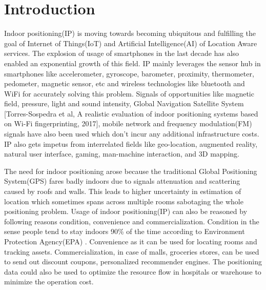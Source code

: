 \section{Introduction} \label{intro}
Indoor positioning(IP) is moving towards becoming ubiquitous and fulfilling the goal of Internet of Things(IoT) and Artificial Intelligence(AI) of Location Aware services.  The explosion of usage of smartphones in the last decade has also enabled an exponential growth of this field. IP mainly leverages the sensor hub in smartphones like accelerometer, gyroscope, barometer, proximity, thermometer, pedometer, magnetic sensor, etc and wireless technologies like bluetooth and WiFi for accurately solving this problem. Signals of opportunities like magnetic field, pressure, light and sound intensity, Global Navigation Satellite System [Torres-Sospedra et al, A realistic evaluation of indoor positioning systems based on Wi-Fi fingerprinting, 2017], mobile network \cite{99} and frequency modulation(FM)\cite{98} signals have also been used which don't incur any additional infrastructure costs.  IP also gets impetus from interrelated fields like geo-location, augmented reality, natural user interface, gaming, man-machine interaction, and 3D mapping.

\vspace{3mm}
The need for indoor positioning arose because the traditional Global Positioning System(GPS) fares badly indoors due to signals attenuation and scattering caused by roofs and walls. This leads to higher uncertainty in estimation of location which sometimes spans across multiple rooms sabotaging the whole positioning problem.  Usage of indoor positioning(IP) can also be reasoned by following reasons  condition,  convenience and commercialization. Condition in the sense people tend to stay indoors 90\% of the time according to Environment Protection Agency(EPA) \cite{geospatial}. Convenience as it can be used for locating rooms and tracking assets. Commercialization, in case of malls, groceries stores, can be used to send out discount coupons, personalized recommender engines. The positioning data could also be used to optimize the resource flow in hospitals or warehouse to minimize the operation cost\cite{max}.

